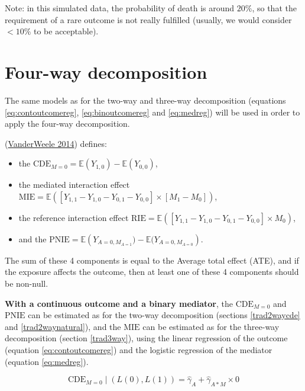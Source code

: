\documentclass[
]{book}
\providecommand{\tightlist}{%
  \setlength{\itemsep}{0pt}\setlength{\parskip}{0pt}}
\begin{document}
Note: in this simulated data, the probability of death is around \(20\%\), so that the requirement of a rare outcome is not really fulfilled (usually, we would consider \(< 10\%\) to be acceptable).

\hypertarget{four-way-decomposition}{%
\section{Four-way decomposition}\label{four-way-decomposition}}

The same models as for the two-way and three-way decomposition (equations \eqref{eq:contoutcomereg}, \eqref{eq:binoutcomereg} and \eqref{eq:medreg}) will be used in order to apply the four-way decomposition.

(\protect\hyperlink{ref-vanderweele2014}{VanderWeele 2014}) defines:

\begin{itemize}
\tightlist
\item
  the \(\text{CDE}_{M=0} = \mathbb{E}\left( Y_{1,0}\right) - \mathbb{E}\left(Y_{0,0} \right)\),
\item
  the mediated interaction effect \(\text{MIE} = \mathbb{E}\left( \left[ Y_{1,1} - Y_{1,0} - Y_{0,1} - Y_{0,0}\right] \times \left[M_1 - M_0 \right]\right)\),
\item
  the reference interaction effect \(\text{RIE} = \mathbb{E}\left( \left[Y_{1,1} - Y_{1,0} - Y_{0,1} - Y_{0,0}\right] \times M_0 \right)\),
\item
  and the \(\text{PNIE} = \mathbb{E}\left(Y_{A=0,M_{A=1}}) - \mathbb{E}(Y_{A=0,M_{A=0}} \right)\).
\end{itemize}

The sum of these 4 components is equal to the Average total effect (ATE), and if the exposure affects the outcome, then at least one of these 4 components should be non-null.

\textbf{With a continuous outcome and a binary mediator}, the \(\text{CDE}_{M=0}\) and \(\text{PNIE}\) can be estimated as for the two-way decomposition (sections \ref{trad2waycde} and \ref{trad2waynatural}), and the \(\text{MIE}\) can be estimated as for the three-way decomposition (section \ref{trad3way}), using the linear regression of the outcome (equation \eqref{eq:contoutcomereg}) and the logistic regression of the mediator (equation \eqref{eq:medreg}).

\[\text{CDE}_{M=0} \mid \left(L(0),L(1) \right) = \hat{\gamma}_A + \hat{\gamma}_{A \ast M} \times 0\]
\end{document}

